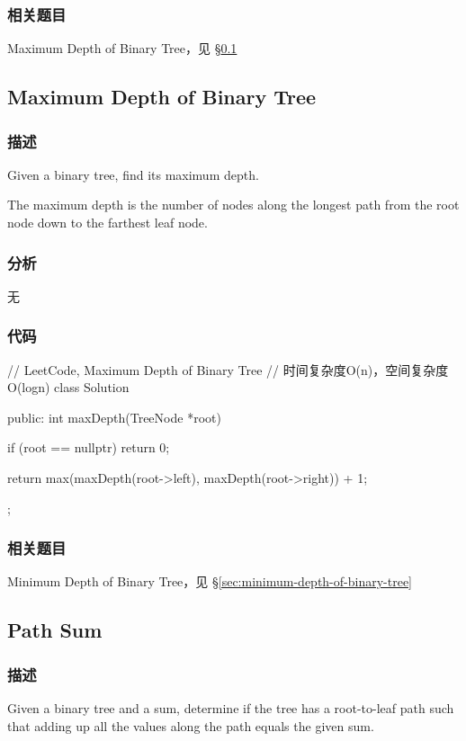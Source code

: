 \subsubsection{相关题目}
\begindot
\item Maximum Depth of Binary Tree，见 \S \ref{sec:maximum-depth-of-binary-tree}
\myenddot


\subsection{Maximum Depth of Binary Tree}
\label{sec:maximum-depth-of-binary-tree}


\subsubsection{描述}
Given a binary tree, find its maximum depth.

The maximum depth is the number of nodes along the longest path from the root node down to the farthest leaf node.


\subsubsection{分析}
无

\subsubsection{代码}

\begin{Code}
// LeetCode, Maximum Depth of Binary Tree
// 时间复杂度O(n)，空间复杂度O(logn)
class Solution {
public:
    int maxDepth(TreeNode *root) {
        if (root == nullptr) return 0;

        return max(maxDepth(root->left), maxDepth(root->right)) + 1;
    }
};
\end{Code}


\subsubsection{相关题目}
\begindot
\item Minimum Depth of Binary Tree，见 \S \ref{sec:minimum-depth-of-binary-tree}
\myenddot


\subsection{Path Sum}
\label{sec:path-sum}


\subsubsection{描述}
Given a binary tree and a sum, determine if the tree has a root-to-leaf path such that adding up all the values along the path equals the given sum.

